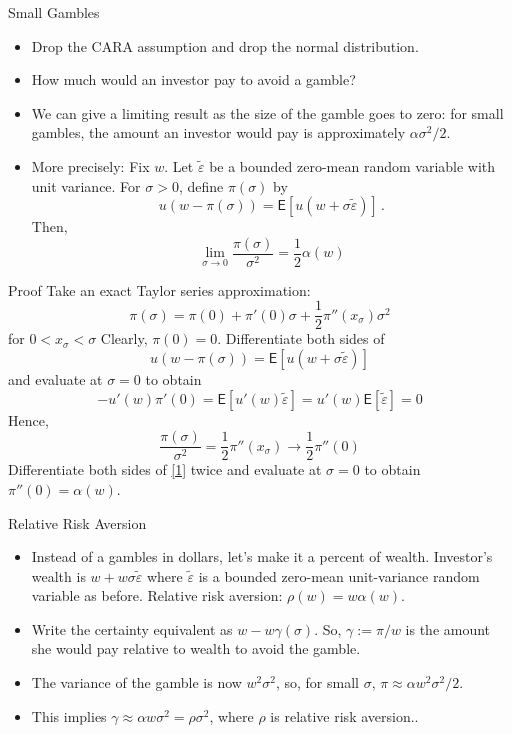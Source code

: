 \documentclass[10pt]{beamer}
\newcommand{\bi}{\begin{itemize}}
\newcommand{\ei}{\end{itemize}}
\newcommand{\im}{\item}
\newcommand{\mye}{\ensuremath{\mathsf{E}}}
\newcommand{\bq}{\begin{equation}}
\newcommand{\eq}{\end{equation}}
\newcommand{\tve}{\tilde{\varepsilon}}
\begin{document}
\begin{frame}{Small Gambles}
\bi
\im Drop the CARA assumption and drop the normal distribution.\im How much would an investor pay to avoid a gamble?
\im We can give a limiting result as the size of the gamble goes to zero:  for small gambles, the amount an investor would pay is approximately $\alpha\sigma^2/2$.
\im More precisely:  Fix $w$.  Let $\tve$ be a bounded zero-mean random variable with unit variance.  For $\sigma>0$, define $\pi(\sigma)$ by 
$$u(w - \pi(\sigma)) = \mye[u(w+\sigma\tve)]\,.$$
Then,
$$\lim_{\sigma \rightarrow 0} \frac{\pi(\sigma)}{\sigma^2} = \frac{1}{2}\alpha(w)$$
\ei
\end{frame}


\begin{frame}{Proof}
Take an exact Taylor series approximation:
$$\pi(\sigma)= \pi(0) + \pi'(0)\sigma + \frac{1}{2}\pi''(x_\sigma)\sigma^2$$
for $0<x_\sigma<\sigma$
Clearly, $\pi(0)=0$.  Differentiate both sides of 
\bq\tag{$\star$}\label{1}
u(w - \pi(\sigma)) = \mye[u(w+\sigma\tve)]
\eq
and evaluate at $\sigma=0$ to obtain
$$-u'(w)\pi'(0) = \mye[u'(w)\tve] = u'(w)\mye[\tve] = 0$$
Hence,
$$\frac{\pi(\sigma)}{\sigma^2} = \frac{1}{2}\pi''(x_\sigma) \rightarrow \frac{1}{2}\pi''(0)$$
Differentiate both sides of \eqref{1}
twice and evaluate at $\sigma=0$ to obtain $\pi''(0) = \alpha(w)$.
\end{frame}

\begin{frame}{Relative Risk Aversion}
\bi
\im Instead of a gambles in dollars, let's make it a percent of wealth.  Investor's wealth is $w + w\sigma\tve$ where $\tve$ is a bounded zero-mean unit-variance random variable as before.  Relative risk aversion: $\rho(w) = w\alpha(w)$.
\im Write the certainty equivalent as $w-w\gamma(\sigma)$.  So, $\gamma := \pi/w$ is the amount she would pay \alert{relative to wealth} to avoid the gamble.
\im The variance of the gamble is now $w^2\sigma^2$, so, for small $\sigma$, $\pi \approx \alpha w^2\sigma^2/2$.
\im This implies $\gamma \approx \alpha w \sigma^2 = \rho \sigma^2$, where $\rho$ is \alert{relative risk aversion}..

\ei
\end{frame}
\end{document}
